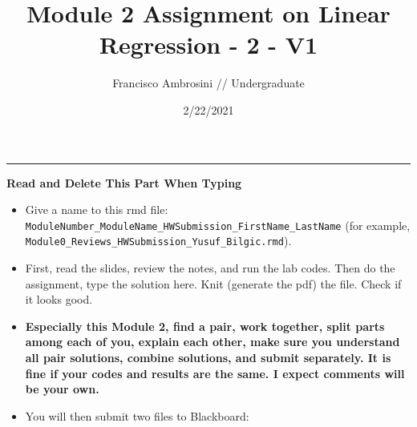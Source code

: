 \documentclass[
]{article}
\title{Module 2 Assignment on Linear Regression - 2 - V1}
\author{Francisco Ambrosini // Undergraduate}
\date{2/22/2021}
\providecommand{\tightlist}{%
  \setlength{\itemsep}{0pt}\setlength{\parskip}{0pt}}
\begin{document}
\maketitle

\begin{center}\rule{0.5\linewidth}{0.5pt}\end{center}

\textbf{Read and Delete This Part When Typing}

\begin{itemize}
\tightlist
\item
  Give a name to this rmd file:
  \texttt{ModuleNumber\_ModuleName\_HWSubmission\_FirstName\_LastName}
  (for example,
  \texttt{Module0\_Reviews\_HWSubmission\_Yusuf\_Bilgic.rmd}).
\item
  First, read the slides, review the notes, and run the lab codes. Then
  do the assignment, type the solution here. Knit (generate the pdf) the
  file. Check if it looks good.
\item
  \textbf{Especially this Module 2, find a pair, work together, split
  parts among each of you, explain each other, make sure you understand
  all pair solutions, combine solutions, and submit separately. It is
  fine if your codes and results are the same. I expect comments will be
  your own.}
\item
  You will then submit two files to Blackboard:


\end{itemize}
\end{document}
